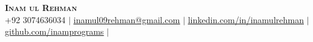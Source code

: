 \documentclass[letterpaper,11pt]{article}
\begin{document}

\begin{center}
  \textbf{\Huge \scshape Inam ul Rehman } \\ \vspace{1pt}
  \small +92 3074636034 $|$
  \href{mailto:inamul09rehman@gmail.com}{\underline{inamul09rehman@gmail.com}} $|$
  \href{https://www.linkedin.com/in/inamulrehman/}{\underline{linkedin.com/in/inamulrehman}} $|$
  \href{https://github.com/inamprograms}{\underline{github.com/inamprograms}} $|$
\end{center}

\end{document}
